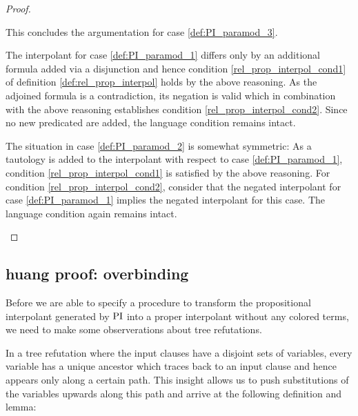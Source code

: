 \begin{proof}
\begin{itemize}
			This concludes the argumentation for case \ref{def:PI_paramod_3}. 

			The interpolant for case \ref{def:PI_paramod_1} differs only by an additional formula added via a disjunction and hence condition \ref{rel_prop_interpol_cond1} of definition \ref{def:rel_prop_interpol} holds by the above reasoning.
			As the adjoined formula is a contradiction, its negation is valid which in combination with the above reasoning establishes condition \ref{rel_prop_interpol_cond2}.
			Since no new predicated are added, the language condition remains intact. 

			The situation in case \ref{def:PI_paramod_2} is somewhat symmetric: 
			As a tautology is added to the interpolant with respect to case \ref{def:PI_paramod_1}, condition \ref{rel_prop_interpol_cond1} is satisfied by the above reasoning.
			For condition \ref{rel_prop_interpol_cond2}, consider that the negated interpolant for case \ref{def:PI_paramod_1} implies the negated interpolant for this case.
			The language condition again remains intact.
			\qedhere
	\end{itemize}
\end{proof}

\subsection{huang proof: overbinding}
Before we are able to specify a procedure to transform the propositional interpolant generated by $\operatorname{PI}$ into a proper interpolant without any colored terms,
we need to make some observerations about tree refutations.

In a tree refutation where the input clauses have a disjoint sets of variables, every variable has a unique ancestor which traces back to an input clause and hence appears only along a certain path.
This insight allows us to push substitutions of the variables upwards along this path and arrive at the following definition and lemma:





